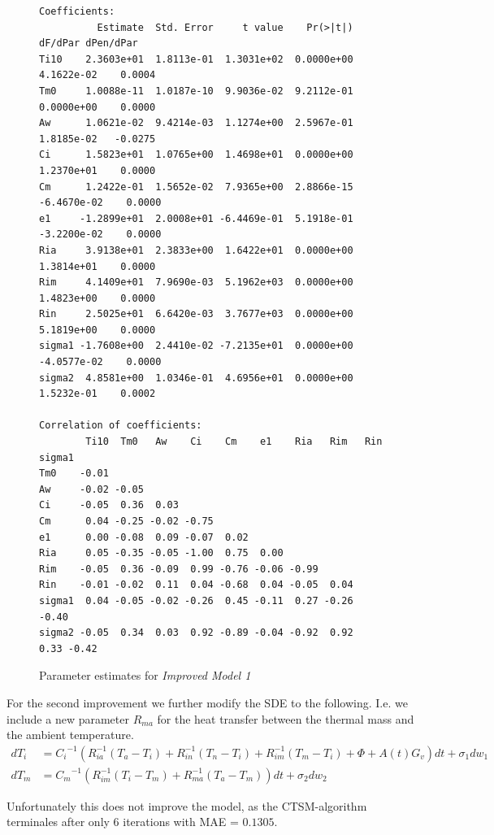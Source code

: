 \documentclass[a4paper]{article}
\begin{document}
\begin{figure}[ht!]
\begin{lstlisting}[basicstyle=\footnotesize\ttfamily,frame=single,breaklines=true]
Coefficients:
          Estimate  Std. Error     t value    Pr(>|t|)     dF/dPar dPen/dPar
Ti10    2.3603e+01  1.8113e-01  1.3031e+02  0.0000e+00  4.1622e-02    0.0004
Tm0     1.0088e-11  1.0187e-10  9.9036e-02  9.2112e-01  0.0000e+00    0.0000
Aw      1.0621e-02  9.4214e-03  1.1274e+00  2.5967e-01  1.8185e-02   -0.0275
Ci      1.5823e+01  1.0765e+00  1.4698e+01  0.0000e+00  1.2370e+01    0.0000
Cm      1.2422e-01  1.5652e-02  7.9365e+00  2.8866e-15 -6.4670e-02    0.0000
e1     -1.2899e+01  2.0008e+01 -6.4469e-01  5.1918e-01 -3.2200e-02    0.0000
Ria     3.9138e+01  2.3833e+00  1.6422e+01  0.0000e+00  1.3814e+01    0.0000
Rim     4.1409e+01  7.9690e-03  5.1962e+03  0.0000e+00  1.4823e+00    0.0000
Rin     2.5025e+01  6.6420e-03  3.7677e+03  0.0000e+00  5.1819e+00    0.0000
sigma1 -1.7608e+00  2.4410e-02 -7.2135e+01  0.0000e+00 -4.0577e-02    0.0000
sigma2  4.8581e+00  1.0346e-01  4.6956e+01  0.0000e+00  1.5232e-01    0.0002

Correlation of coefficients:
        Ti10  Tm0   Aw    Ci    Cm    e1    Ria   Rim   Rin   sigma1
Tm0    -0.01
Aw     -0.02 -0.05
Ci     -0.05  0.36  0.03
Cm      0.04 -0.25 -0.02 -0.75
e1      0.00 -0.08  0.09 -0.07  0.02
Ria     0.05 -0.35 -0.05 -1.00  0.75  0.00
Rim    -0.05  0.36 -0.09  0.99 -0.76 -0.06 -0.99
Rin    -0.01 -0.02  0.11  0.04 -0.68  0.04 -0.05  0.04
sigma1  0.04 -0.05 -0.02 -0.26  0.45 -0.11  0.27 -0.26 -0.40
sigma2 -0.05  0.34  0.03  0.92 -0.89 -0.04 -0.92  0.92  0.33 -0.42
\end{lstlisting}
\caption{Parameter estimates for \emph{Improved Model 1}}
\label{fig:improved_1}
\end{figure}

For the second improvement we further modify the SDE to the following. I.e. we include a new parameter $R_{ma}$ for the heat transfer between the thermal mass and the ambient temperature.
\begin{align}
    dT_i &= {C_i}^{-1} \left( R_{ia}^{-1} (T_a - T_i) + R_{in}^{-1} (T_n - T_i) + R_{im}^{-1} (T_m - T_i) + \Phi + A(t) G_v \right) \mathit{dt} + \sigma_1 \mathit{dw}_1 \\
    dT_m &= {C_m}^{-1} \left( R_{im}^{-1} (T_i - T_m) + R_{ma}^{-1} (T_a - T_m)  \right) \mathit{dt} + \sigma_2 \mathit{dw}_2 
\end{align}

Unfortunately this does not improve the model, as the CTSM-algorithm terminales after only 6 iterations with MAE = $0.1305$.
\end{document}
